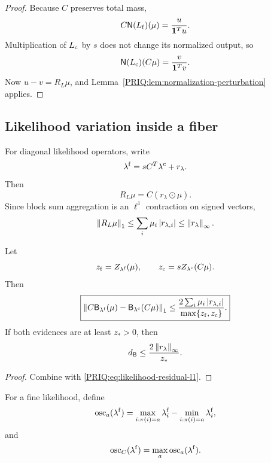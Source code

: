 \begin{proof}
Because $C$ preserves total mass,
\[
  C\mathsf N(L_{\mathrm f})(\mu)
  =\frac{u}{\mathbf 1^Tu}.
\]
Multiplication of $L_{\mathrm c}$ by $s$ does not change its normalized output, so
\[
  \mathsf N(L_{\mathrm c})(C\mu)
  =\frac{v}{\mathbf 1^Tv}.
\]
Now $u-v=R_L\mu$, and Lemma~\ref{PRIQ:lem:normalization-perturbation} applies.
\end{proof}

\subsection{Likelihood variation inside a fiber}
For diagonal likelihood operators, write
\begin{equation}\label{PRIQ:eq:likelihood-residual}
  \lambda^{\mathrm f}
  =
  sC^T\lambda^{\mathrm c}+r_{\lambda}.
\end{equation}
Then
\[
  R_L\mu=C(r_{\lambda}\odot\mu).
\]
Since block sum aggregation is an $\ell^1$ contraction on signed vectors,
\begin{equation}\label{PRIQ:eq:likelihood-residual-l1}
  \left\lVert R_L\mu\right\rVert_1
  \leq
  \sum_i\mu_i\left\lvert r_{\lambda,i}\right\rvert
  \leq
  \left\lVert r_{\lambda}\right\rVert_{\infty}.
\end{equation}

\begin{PRIQcorollary}\label{PRIQ:cor:bayes-refinement-defect}
Let
\[
  z_{\mathrm f}=Z_{\lambda^{\mathrm f}}(\mu),
  \qquad
  z_{\mathrm c}=sZ_{\lambda^{\mathrm c}}(C\mu).
\]
Then
\begin{equation}\label{PRIQ:eq:bayes-refinement-defect}
  \boxed{
  \left\lVert 
  C\mathsf B_{\lambda^{\mathrm f}}(\mu)
  -
  \mathsf B_{\lambda^{\mathrm c}}(C\mu)
  \right\rVert_1
  \leq
  \frac{2\sum_i\mu_i\left\lvert r_{\lambda,i}\right\rvert}
  {\max\{z_{\mathrm f},z_{\mathrm c}\}}.}
\end{equation}
If both evidences are at least $z_*>0$, then
\begin{equation}\label{PRIQ:eq:bayes-refinement-uniform}
  d_{\mathsf B}
  \leq
  \frac{2\left\lVert r_{\lambda}\right\rVert_{\infty}}{z_*}.
\end{equation}
\end{PRIQcorollary}

\begin{proof}
Combine  with \eqref{PRIQ:eq:likelihood-residual-l1}.
\end{proof}

\begin{PRIQdefinition}\label{PRIQ:def:fiber-oscillation}
For a fine likelihood, define
\[
  \operatorname{osc}_a(\lambda^{\mathrm f})
  =
  \max_{i:\pi(i)=a}\lambda_i^{\mathrm f}
  -
  \min_{i:\pi(i)=a}\lambda_i^{\mathrm f},
\]
and
\[
  \operatorname{osc}_C(\lambda^{\mathrm f})
  =\max_a\operatorname{osc}_a(\lambda^{\mathrm f}).
\]
\end{PRIQdefinition}

